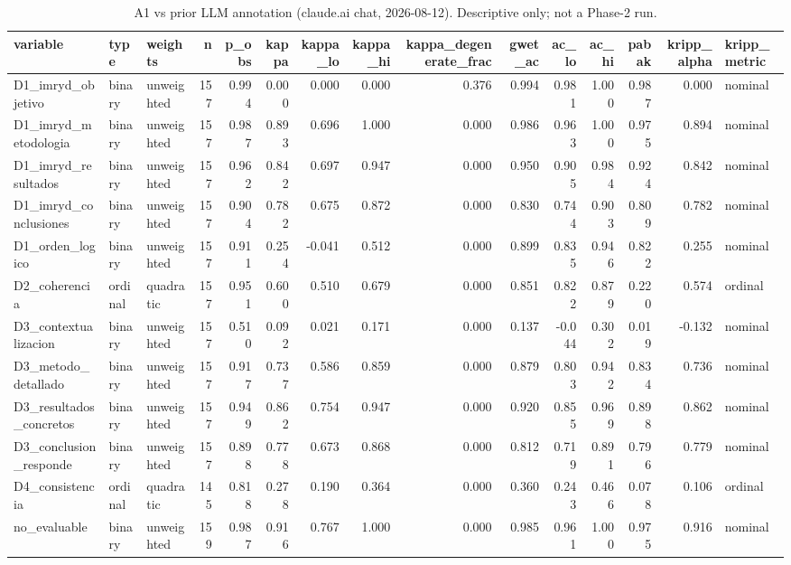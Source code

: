 \begin{table}
\caption{A1 vs prior LLM annotation (claude.ai chat, 2026-08-12). Descriptive only; not a Phase-2 run.}
\label{tab:audit-hl}
\begin{tabular}{lllrrrrrrrrrrrl}
\toprule
variable & type & weights & n & p\_obs & kappa & kappa\_lo & kappa\_hi & kappa\_degenerate\_frac & gwet\_ac & ac\_lo & ac\_hi & pabak & kripp\_alpha & kripp\_metric \\
\midrule
D1\_imryd\_objetivo & binary & unweighted & 157 & 0.994 & 0.000 & 0.000 & 0.000 & 0.376 & 0.994 & 0.981 & 1.000 & 0.987 & 0.000 & nominal \\
D1\_imryd\_metodologia & binary & unweighted & 157 & 0.987 & 0.893 & 0.696 & 1.000 & 0.000 & 0.986 & 0.963 & 1.000 & 0.975 & 0.894 & nominal \\
D1\_imryd\_resultados & binary & unweighted & 157 & 0.962 & 0.842 & 0.697 & 0.947 & 0.000 & 0.950 & 0.905 & 0.984 & 0.924 & 0.842 & nominal \\
D1\_imryd\_conclusiones & binary & unweighted & 157 & 0.904 & 0.782 & 0.675 & 0.872 & 0.000 & 0.830 & 0.744 & 0.903 & 0.809 & 0.782 & nominal \\
D1\_orden\_logico & binary & unweighted & 157 & 0.911 & 0.254 & -0.041 & 0.512 & 0.000 & 0.899 & 0.835 & 0.946 & 0.822 & 0.255 & nominal \\
D2\_coherencia & ordinal & quadratic & 157 & 0.951 & 0.600 & 0.510 & 0.679 & 0.000 & 0.851 & 0.822 & 0.879 & 0.220 & 0.574 & ordinal \\
D3\_contextualizacion & binary & unweighted & 157 & 0.510 & 0.092 & 0.021 & 0.171 & 0.000 & 0.137 & -0.044 & 0.302 & 0.019 & -0.132 & nominal \\
D3\_metodo\_detallado & binary & unweighted & 157 & 0.917 & 0.737 & 0.586 & 0.859 & 0.000 & 0.879 & 0.803 & 0.942 & 0.834 & 0.736 & nominal \\
D3\_resultados\_concretos & binary & unweighted & 157 & 0.949 & 0.862 & 0.754 & 0.947 & 0.000 & 0.920 & 0.855 & 0.969 & 0.898 & 0.862 & nominal \\
D3\_conclusion\_responde & binary & unweighted & 157 & 0.898 & 0.778 & 0.673 & 0.868 & 0.000 & 0.812 & 0.719 & 0.891 & 0.796 & 0.779 & nominal \\
D4\_consistencia & ordinal & quadratic & 145 & 0.818 & 0.278 & 0.190 & 0.364 & 0.000 & 0.360 & 0.243 & 0.466 & 0.078 & 0.106 & ordinal \\
no\_evaluable & binary & unweighted & 159 & 0.987 & 0.916 & 0.767 & 1.000 & 0.000 & 0.985 & 0.961 & 1.000 & 0.975 & 0.916 & nominal \\
\bottomrule
\end{tabular}
\end{table}
